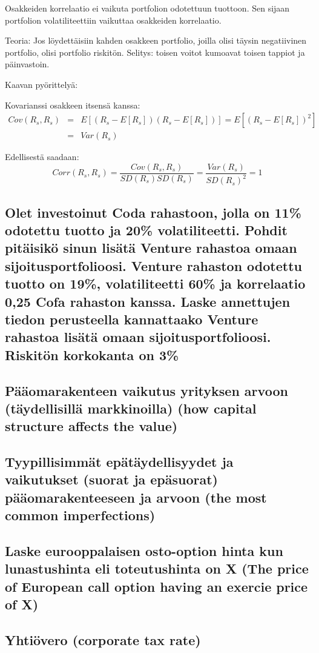 \documentclass[a4paper]{article}
\begin{document}
Osakkeiden korrelaatio ei vaikuta portfolion odotettuun tuottoon. Sen sijaan portfolion volatiliteettiin vaikuttaa osakkeiden korrelaatio.

Teoria: Jos löydettäisiin kahden osakkeen portfolio, joilla olisi täysin negatiivinen portfolio, olisi portfolio riskitön. Selitys: toisen voitot kumoavat toisen tappiot ja päinvastoin.

Kaavan pyörittelyä:

Kovarianssi osakkeen itsensä kanssa:
\[
\begin{array}{lcl}
Cov(R_s, R_s) & = & E[(R_s - E[R_s])(R_s - E[R_s])] = E[(R_s - E[R_s])^2] \\
 & = & Var(R_s)
\end{array}
\]

Edellisestä saadaan:
\[
Corr(R_s, R_s) = \frac{Cov(R_s, R_s)}{SD(R_s) SD(R_s)} = \frac{Var(R_s)}{SD(R_s)^2} = 1
\]

\subsection{Olet investoinut Coda rahastoon, jolla on 11\% odotettu tuotto ja 20\% volatiliteetti. Pohdit pitäisikö sinun lisätä Venture rahastoa omaan sijoitusportfolioosi. Venture rahaston odotettu tuotto on 19\%, volatiliteetti 60\% ja korrelaatio 0,25 Cofa rahaston kanssa. Laske annettujen tiedon perusteella kannattaako Venture rahastoa lisätä omaan sijoitusportfolioosi. Riskitön korkokanta on 3\%}

\subsection{Pääomarakenteen vaikutus yrityksen arvoon (täydellisillä markkinoilla) (how capital structure affects the value)}

\subsection{Tyypillisimmät epätäydellisyydet ja vaikutukset (suorat ja epäsuorat) pääomarakenteeseen ja arvoon
(the most common imperfections)}

\subsection{Laske eurooppalaisen osto-option hinta kun lunastushinta eli toteutushinta on X (The price of European call option having an exercie price of X)}

\subsection{Yhtiövero (corporate tax rate)}
\end{document}
